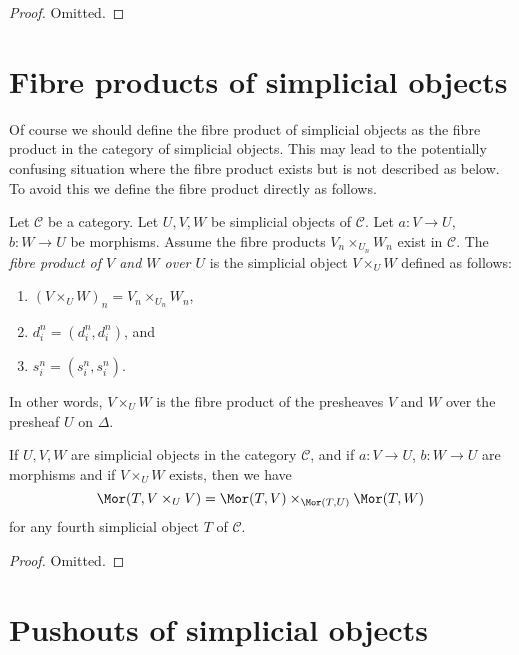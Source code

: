\begin{proof}
Omitted.
\end{proof}


\section{Fibre products of simplicial objects}
\label{section-fibre-products}

\noindent
Of course we should define the fibre product of simplicial objects
as the fibre product in the category of simplicial objects. This
may lead to the potentially confusing situation where the
fibre product exists but is not described as below. To avoid
this we define the fibre product directly as follows.

\begin{definition}
\label{definition-fibre-product}
Let $\mathcal{C}$ be a category.
Let $U, V, W$ be simplicial objects of $\mathcal{C}$.
Let $a : V \to U$, $b : W \to U$ be morphisms.
Assume the fibre products $V_n \times_{U_n} W_n$ exist in $\mathcal{C}$.
The {\it fibre product of $V$ and $W$ over $U$} is the simplicial object
$V \times_U W$ defined as follows:
\begin{enumerate}
\item $(V \times_U W)_n = V_n \times_{U_n} W_n$,
\item $d^n_i = (d^n_i, d^n_i)$, and
\item $s^n_i = (s^n_i, s^n_i)$.
\end{enumerate}
In other words, $V \times_U W$ is the fibre product of the presheaves
$V$ and $W$ over the presheaf $U$ on $\Delta$.
\end{definition}

\begin{lemma}
\label{lemma-fibre-product}
If $U, V, W$ are simplicial objects in the category $\mathcal{C}$,
and if $a : V \to U$, $b : W \to U$ are morphisms
and if $V \times_U W$ exists, then we have
$$
\Mor(T, V \times_U V) =
\Mor(T, V) \times_{\Mor(T, U)}
\Mor(T, W)
$$
for any fourth simplicial object $T$ of $\mathcal{C}$.
\end{lemma}

\begin{proof}
Omitted.
\end{proof}

\section{Pushouts of simplicial objects}
\label{section-push-outs}

